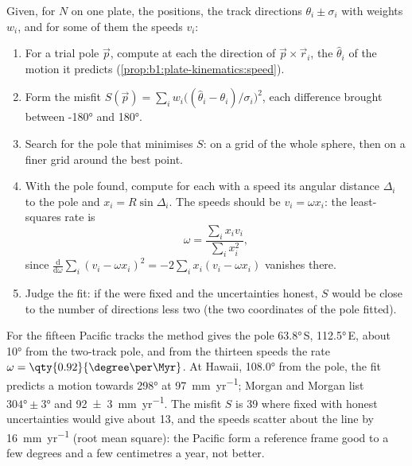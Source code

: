 \begin{method}\label{met:b1:hotspots:pole-fit}
Given, for $N$  on one plate, the positions, the track directions
$\theta_i \pm \sigma_i$ with weights $w_i$, and for some of them the speeds
$v_i$:
\begin{enumerate}
  \item For a trial pole $\vec p$, compute at each  the direction of
        $\vec p\times\vec r_i$, the  $\hat\theta_i$ of the motion it
        predicts (\cref{prop:b1:plate-kinematics:speed}).
  \item Form the misfit $S(\vec p) = \sum_i w_i\bigl((\hat\theta_i -
        \theta_i)/\sigma_i\bigr)^2$, each difference brought between
        \ang{-180} and \ang{180}.
  \item Search for the pole that minimises $S$: on a grid of the whole sphere,
        then on a finer grid around the best point.
  \item With the pole found, compute for each  with a speed its angular
        distance $\Delta_i$ to the pole and $x_i = R\sin\Delta_i$. The speeds
        should be $v_i = \omega x_i$: the least-squares rate is
        \[
          \omega = \frac{\sum_i x_i v_i}{\sum_i x_i^2},
        \]
        since $\frac{\mathrm d}{\mathrm d\omega}\sum_i (v_i - \omega x_i)^2 =
        -2\sum_i x_i(v_i - \omega x_i)$ vanishes there.
  \item Judge the fit: if the  were fixed and the uncertainties
        honest, $S$ would be close to the number of directions less two (the
        two coordinates of the pole fitted).
\end{enumerate}
\end{method}

For the fifteen Pacific tracks the method gives the pole \ang{63.8}\,S,
\ang{112.5}\,E, about \ang{10} from the two-track pole, and from the thirteen
speeds the rate $\omega = \qty{0.92}{\degree\per\Myr}$. At Hawaii, \ang{108.0}
from the pole, the fit predicts a motion towards \ang{298} at
\qty{97}{mm.yr^{-1}}; Morgan and Morgan list $\ang{304}\pm\ang{3}$ and
\qty[uncertainty-mode=separate]{92 \pm 3}{mm.yr^{-1}}. The misfit $S$ is 39
where fixed  with honest uncertainties would give about 13, and the
speeds scatter about the line by \qty{16}{mm.yr^{-1}} (root mean square): the
Pacific  form a reference frame good to a few degrees and a few
centimetres a year, not better.

